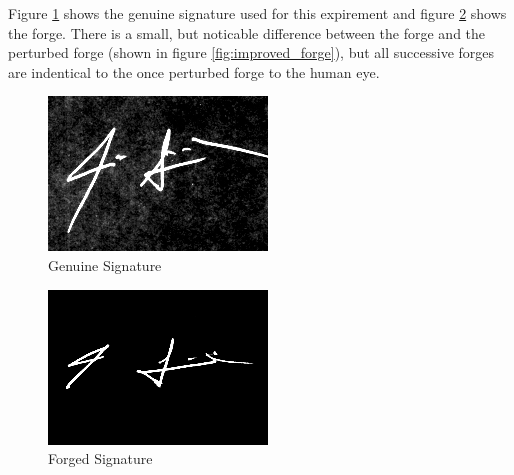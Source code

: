 Figure \ref{fig:genuine} shows the genuine signature used for this expirement and figure \ref{fig:forge} shows the forge.
There is a small, but noticable difference between the forge and the perturbed forge (shown in figure \ref{fig:improved_forge}), but all successive forges are indentical to the once perturbed forge to the human eye.
\begin{figure}[h]
    \begin{center}
        \includegraphics[width=0.8\linewidth]{original_1_1_transformed.png}
    \end{center}
    \caption{Genuine Signature}
    \label{fig:genuine}
\end{figure}
\begin{figure}[h]
    \begin{center}
        \includegraphics[width=0.8\linewidth]{forgeries_1_1_transformed.png}
    \end{center}
    \caption{Forged Signature}
    \label{fig:forge}
\end{figure}

